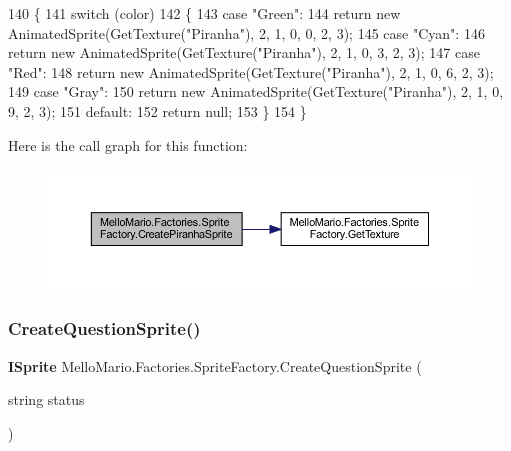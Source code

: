 \begin{DoxyCode}
140         \{
141             \textcolor{keywordflow}{switch} (color)
142             \{
143                 \textcolor{keywordflow}{case} \textcolor{stringliteral}{"Green"}:
144                     \textcolor{keywordflow}{return} \textcolor{keyword}{new} AnimatedSprite(GetTexture(\textcolor{stringliteral}{"Piranha"}), 2, 1, 0, 0, 2, 3);
145                 \textcolor{keywordflow}{case} \textcolor{stringliteral}{"Cyan"}:
146                     \textcolor{keywordflow}{return} \textcolor{keyword}{new} AnimatedSprite(GetTexture(\textcolor{stringliteral}{"Piranha"}), 2, 1, 0, 3, 2, 3);
147                 \textcolor{keywordflow}{case} \textcolor{stringliteral}{"Red"}:
148                     \textcolor{keywordflow}{return} \textcolor{keyword}{new} AnimatedSprite(GetTexture(\textcolor{stringliteral}{"Piranha"}), 2, 1, 0, 6, 2, 3);
149                 \textcolor{keywordflow}{case} \textcolor{stringliteral}{"Gray"}:
150                     \textcolor{keywordflow}{return} \textcolor{keyword}{new} AnimatedSprite(GetTexture(\textcolor{stringliteral}{"Piranha"}), 2, 1, 0, 9, 2, 3);
151                 \textcolor{keywordflow}{default}:
152                     \textcolor{keywordflow}{return} null;
153             \}
154         \}
\end{DoxyCode}
Here is the call graph for this function\+:
\nopagebreak
\begin{figure}[H]
\begin{center}
\leavevmode
\includegraphics[width=350pt]{classMelloMario_1_1Factories_1_1SpriteFactory_af8c46fbd5dbdb044a36f591e48ea96bb_cgraph}
\end{center}
\end{figure}
\mbox{\label{classMelloMario_1_1Factories_1_1SpriteFactory_a02466d3194ffe50ff66dba1069db447a}} 
\subsubsection{Create\+Question\+Sprite()}
{\footnotesize\ttfamily \textbf{ I\+Sprite} Mello\+Mario.\+Factories.\+Sprite\+Factory.\+Create\+Question\+Sprite (\begin{DoxyParamCaption}\item[{string}]{status }\end{DoxyParamCaption})}




